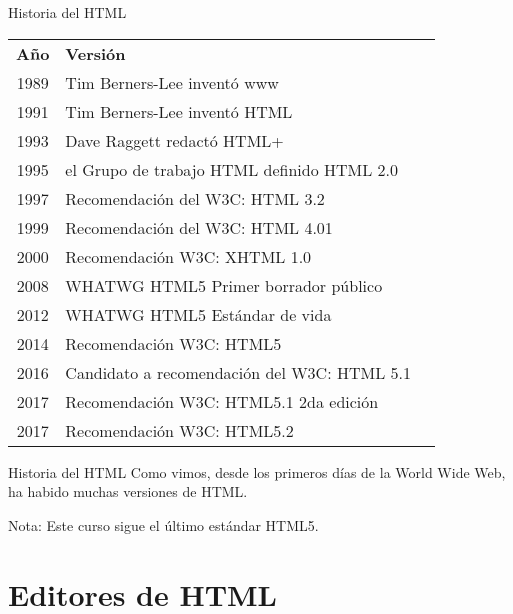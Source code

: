 \begin{frame}[c]{Historia del HTML}
  \begin{table}[]
  \begin{tabular}{cll}
    \textbf{Año} &  \textbf{Versión} \\
    \rowcolor{light-gray}
    1989 & Tim Berners-Lee inventó www \\
    1991 & Tim Berners-Lee inventó HTML \\
    \rowcolor{light-gray}
    1993 & Dave Raggett redactó HTML+ \\
    1995 & el Grupo de trabajo HTML definido HTML 2.0 \\
    \rowcolor{light-gray}
    1997 & Recomendación del W3C: HTML 3.2 \\
    1999 & Recomendación del W3C: HTML 4.01 \\
    \rowcolor{light-gray}
    2000 & Recomendación W3C: XHTML 1.0 \\
    2008 & WHATWG HTML5 Primer borrador público \\
    \rowcolor{light-gray}
    2012 & WHATWG HTML5 Estándar de vida \\
    2014 & Recomendación W3C: HTML5 \\
    \rowcolor{light-gray}
    2016 & Candidato a recomendación del W3C: HTML 5.1 \\
    2017 & Recomendación W3C: HTML5.1 2da edición \\
    \rowcolor{light-gray}
    2017 & Recomendación W3C: HTML5.2 \\
  \end{tabular}
  \end{table}
\end{frame}

\begin{frame}[c]{Historia del HTML}
  Como vimos, desde los primeros días de la World Wide Web,
  ha habido muchas versiones de HTML.

  \vspace{\baselineskip}
  \begin{exampleblock}{Nota:}
    Este curso sigue el último estándar HTML5.
  \end{exampleblock}

\end{frame}

\section{Editores de HTML}

